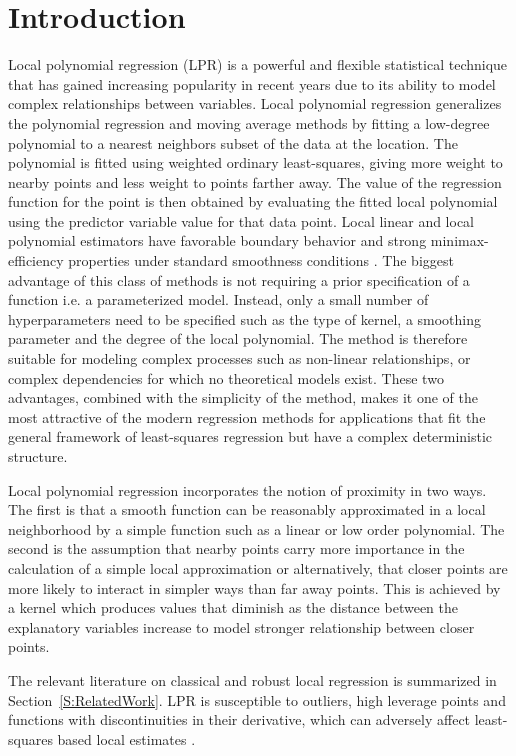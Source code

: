 \documentclass[preprint,1p,times,authoryear]{elsarticle}
\begin{document}
\section{Introduction}
\label{s:Introduction}
Local polynomial regression (LPR) is a powerful and flexible statistical technique that has gained increasing popularity in recent years due to its ability to model complex relationships between variables. Local polynomial regression generalizes the polynomial regression and moving average methods by fitting a low-degree polynomial to a nearest neighbors subset of the data at the location. The polynomial is fitted using weighted ordinary least-squares, giving more weight to nearby points and less weight to points farther away. The value of the regression function for the point is then obtained by evaluating the fitted local polynomial using the predictor variable value for that data point. Local linear and local polynomial estimators have favorable boundary behavior and strong minimax-efficiency properties under standard smoothness conditions \citep{Fan1993,Fan1996Local}. The biggest advantage of this class of methods is not requiring a prior specification of a function i.e. a parameterized model. Instead, only a small number of hyperparameters need to be specified such as the type of kernel, a smoothing parameter and the degree of the local polynomial. The method is therefore suitable for modeling complex processes such as non-linear relationships, or complex dependencies for which no theoretical models exist. These two advantages, combined with the simplicity of the method, makes it one of the most attractive of the modern regression methods for applications that fit the general framework of least-squares regression but have a complex deterministic structure. 

Local polynomial regression incorporates the notion of proximity in two ways. The first is that a smooth function can be reasonably approximated in a local neighborhood by a simple function such as a linear or low order polynomial. The second is the assumption that nearby points carry more importance in the calculation of a simple local approximation or alternatively, that closer points are more likely to interact in simpler ways than far away points. This is achieved by a kernel which produces values that diminish as the distance between the explanatory variables increase to model stronger relationship between closer points. 

The relevant literature on classical and robust local regression is summarized in Section~\ref{S:RelatedWork}. LPR is susceptible to outliers, high leverage points and functions with discontinuities in their derivative, which can adversely affect least-squares based local estimates \citep{10.1002/wics.1492}.
\end{document}
